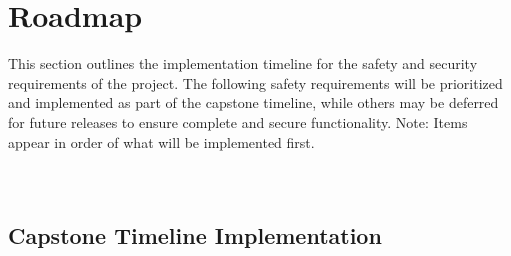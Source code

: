 \documentclass{article}
\begin{document}
\section{Roadmap}

This section outlines the implementation timeline for the safety and security requirements of the project. The following safety requirements will be prioritized and implemented as part of the capstone timeline, while others may be deferred for future releases to ensure complete and secure functionality. Note: Items appear in order of what will be implemented first.
\\ \\ \\
\subsection{Capstone Timeline Implementation}
\end{document}
